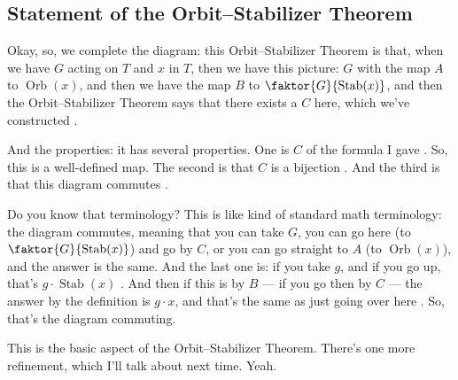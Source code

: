 \begin{hidden}
\end{hidden}

\subsection{Statement of the Orbit--Stabilizer Theorem}

\begin{speech}[00:34:58 - 00:36:51]
Okay, so, we complete the diagram: this Orbit--Stabilizer Theorem is that, when we have $G$ acting on $T$ and $x$ in $T$, then we have this picture: $G$ with the map $A$ to $\operatorname{Orb}(x)$, and then we have the map $B$ to $\faktor{G}{\operatorname{Stab}(x)}$, and then the Orbit--Stabilizer Theorem says that there exists a $C$ here, which we've constructed .

And the properties: it has several properties. One is $C$ of the formula I gave . So, this is a well-defined map. The second is that $C$ is a bijection . And the third is that this diagram commutes .

Do you know that terminology? This is like kind of standard math terminology: the diagram commutes, meaning that you can take $G$, you can go here (to $\faktor{G}{\operatorname{Stab}(x)}$) and go by $C$, or you can go straight to $A$ (to $\operatorname{Orb}(x)$), and the answer is the same. And the last one is: if you take $g$, and if you go up, that's $g \cdot \operatorname{Stab}(x)$ . And then if this is by $B$ --- if you go then by $C$ --- the answer by the definition is $g \cdot x$, and that's the same as just going over here . So, that's the diagram commuting.

This is the basic aspect of the Orbit--Stabilizer Theorem. There's one more refinement, which I'll talk about next time. Yeah.
\end{speech}

